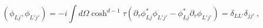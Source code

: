 \begin{equation}\label{KGinnerprod}
(\phi_{Lj},\phi_{L'j'})=-i\int d\Omega \cosh^{d-1}\tau 
\left(\partial_{\tau}\phi^*_{Lj}\phi_{L'j'}-
\phi^*_{Lj}\partial_{\tau}\phi_{L'j'}\right)=
\delta_{LL'}\delta_{jj'}
\ ,
\end{equation}

